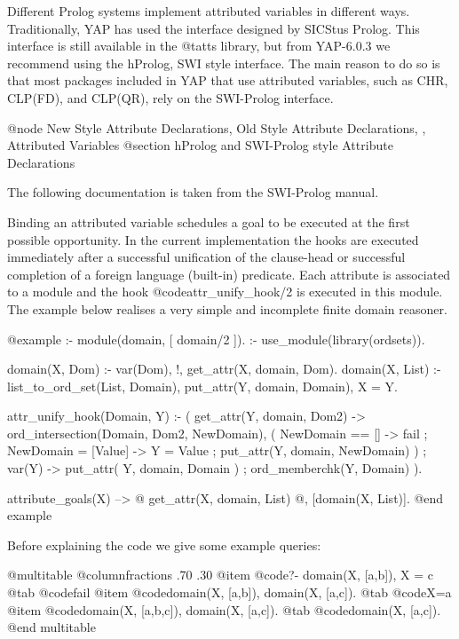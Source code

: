 {{{{{{{{{Different Prolog systems implement attributed variables in different
ways. Traditionally, YAP has used the interface designed by SICStus
Prolog. This interface is still
available in the @t{atts} library, but from YAP-6.0.3 we recommend using
the hProlog, SWI style interface. The main reason to do so is that 
most packages included in YAP that use attributed variables, such as CHR, CLP(FD), and CLP(QR),
rely on the SWI-Prolog interface.


@node New Style Attribute Declarations, Old Style Attribute Declarations, , Attributed Variables
@section hProlog and SWI-Prolog style Attribute Declarations

The following documentation is taken from the SWI-Prolog manual.

Binding an attributed variable schedules a goal to be executed at the
first possible opportunity. In the current implementation the hooks are
executed immediately after a successful unification of the clause-head
or successful completion of a foreign language (built-in) predicate. Each
attribute is associated to a module and the hook @code{attr_unify_hook/2} is
executed in this module.  The example below realises a very simple and
incomplete finite domain reasoner.

@example
:- module(domain,
	  [ domain/2			%
	  ]).
:- use_module(library(ordsets)).

domain(X, Dom) :-
	var(Dom), !,
	get_attr(X, domain, Dom).
domain(X, List) :-
	list_to_ord_set(List, Domain),
	put_attr(Y, domain, Domain),
	X = Y.


attr_unify_hook(Domain, Y) :-
	(   get_attr(Y, domain, Dom2)
	->  ord_intersection(Domain, Dom2, NewDomain),
	    (   NewDomain == []
	    ->	fail
	    ;	NewDomain = [Value]
	    ->	Y = Value
	    ;	put_attr(Y, domain, NewDomain)
	    )
	;   var(Y)
	->  put_attr( Y, domain, Domain )
	;   ord_memberchk(Y, Domain)
	).


attribute_goals(X) -->
	@{ get_attr(X, domain, List) @},
	[domain(X, List)].
@end example


Before explaining the code we give some example queries:

@multitable @columnfractions .70 .30
            @item @code{?- domain(X, [a,b]), X = c}
@tab @code{fail}
@item @code{domain(X, [a,b]), domain(X, [a,c]).}
           @tab @code{X=a}
    @item @code{domain(X, [a,b,c]), domain(X, [a,c]).}
     @tab @code{domain(X, [a,c]).}
    @end multitable

}}}}}}}}}

